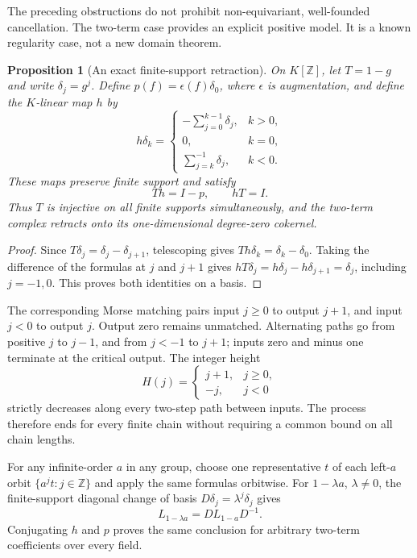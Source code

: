 \documentclass[11pt,a4paper,oneside]{report}
\newtheorem{proposition}[theorem]{Proposition}
\theoremstyle{definition}
\theoremstyle{remark}
\newcommand{\Z}{\mathbb Z}
\begin{document}
The preceding obstructions do not prohibit non-equivariant,
well-founded cancellation. The two-term case provides an explicit
positive model. It is a known regularity case, not a new domain theorem.

\begin{proposition}[An exact finite-support retraction]\label{M07:prop:retract}
On $K[\Z]$, let $T=1-g$ and write $\delta_j=g^j$.
Define $p(f)=\epsilon(f)\delta_0$, where $\epsilon$ is augmentation,
and define the $K$-linear map $h$ by
\[
h\delta_k=
\begin{cases}
-\displaystyle\sum_{j=0}^{k-1}\delta_j,&k>0,\\[3pt]
0,&k=0,\\[3pt]
\displaystyle\sum_{j=k}^{-1}\delta_j,&k<0.
\end{cases}
\]
These maps preserve finite support and satisfy
\begin{equation}\label{M07:eq:retract}
\boxed{Th=I-p,\qquad hT=I.}
\end{equation}
Thus $T$ is injective on all finite supports simultaneously,
and the two-term complex retracts onto its one-dimensional
degree-zero cokernel.
\end{proposition}
\begin{proof}
Since $T\delta_j=\delta_j-\delta_{j+1}$, telescoping gives
$Th\delta_k=\delta_k-\delta_0$. Taking the difference of
the formulas at $j$ and $j+1$ gives
$hT\delta_j=h\delta_j-h\delta_{j+1}=\delta_j$,
including $j=-1,0$. This proves both identities on a basis.
\end{proof}

The corresponding Morse matching pairs input $j\ge0$ to
output $j+1$, and input $j<0$ to output $j$. Output zero
remains unmatched. Alternating paths go from positive $j$
to $j-1$, and from $j<-1$ to $j+1$; inputs zero and minus
one terminate at the critical output. The integer height
\[
H(j)=\begin{cases}j+1,&j\ge0,\\-j,&j<0\end{cases}
\]
strictly decreases along every two-step path between inputs.
The process therefore ends for every finite chain without
requiring a common bound on all chain lengths.

For any infinite-order $a$ in any group, choose one representative
$t$ of each left-$a$ orbit $\{a^jt:j\in\Z\}$ and apply the
same formulas orbitwise. For $1-\lambda a$, $\lambda\ne0$,
the finite-support diagonal change of basis
$D\delta_j=\lambda^j\delta_j$ gives
\[
L_{1-\lambda a}=D L_{1-a}D^{-1}.
\]
Conjugating $h$ and $p$ proves the same conclusion for arbitrary
two-term coefficients over every field.
\end{document}
